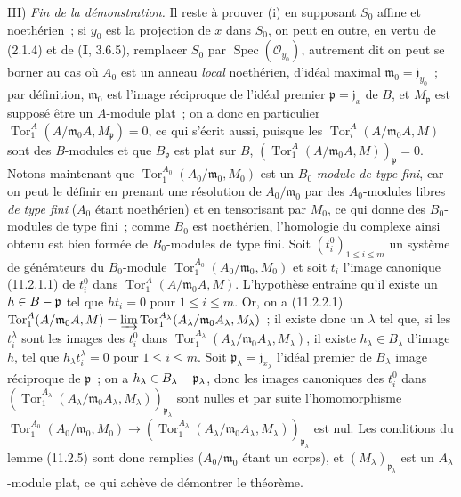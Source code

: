 \medskip
\noindent III) \emph{Fin de la démonstration.} Il reste à prouver
(i) en supposant $S_0$ affine et noethérien~; si $y_0$ est la projection de
$x$ dans $S_0$, on peut en outre, en vertu de (2.1.4) et de
($\mathbf I$, 3.6.5), remplacer $S_0$ par
$\operatorname{Spec}(\mathcal O_{y_0})$, autrement dit on peut se borner au
cas où $A_0$ est un anneau \emph{local} noethérien, d'idéal maximal
$\mathfrak m_0=\mathfrak j_{y_0}$~; par définition, $\mathfrak m_0$ est
l'image réciproque de l'idéal premier $\mathfrak p=\mathfrak j_x$ de $B$,
et $M_{\mathfrak p}$ est supposé être un $A$-module plat~; on a donc en
particulier $\operatorname{Tor}_1^A(A/\mathfrak m_0A,M_{\mathfrak p})=0$,
ce qui s'écrit aussi, puisque les $\operatorname{Tor}_i^A(A/\mathfrak m_0A,M)$
sont des $B$-modules et que $B_{\mathfrak p}$ est plat sur $B$,
$(\operatorname{Tor}_1^A(A/\mathfrak m_0A,M))_{\mathfrak p}=0$.
Notons maintenant que $\operatorname{Tor}_1^{A_0}(A_0/\mathfrak m_0,M_0)$
est un $B_0$-\emph{module de type fini}, car on peut le définir en prenant
une résolution de $A_0/\mathfrak m_0$ par des $A_0$-modules libres
\emph{de type fini} ($A_0$ étant noethérien) et en tensorisant par $M_0$, ce
qui donne des $B_0$-modules de type fini~; comme $B_0$ est noethérien,
l'homologie du complexe ainsi obtenu est bien formée de $B_0$-modules de
type fini. Soit $(t_i^0)_{1\leq i\leq m}$ un système de générateurs du
$B_0$-module $\operatorname{Tor}_1^{A_0}(A_0/\mathfrak m_0,M_0)$ et soit
$t_i$ l'image canonique (11.2.1.1) de $t_i^0$ dans
$\operatorname{Tor}_1^A(A/\mathfrak m_0A,M)$. L'hypothèse entraîne qu'il
existe un $h\in B-\mathfrak p$ tel que $ht_i=0$ pour $1\leq i\leq m$. Or,
on a (11.2.2.1)
$\operatorname{Tor}_1^A(A/\mathfrak m_0A,M)=
\varinjlim\operatorname{Tor}_1^{A_\lambda}
(A_\lambda/\mathfrak m_0A_\lambda,M_\lambda)$~;
il existe donc un $\lambda$ tel que, si les $t_i^\lambda$ sont les images
des $t_i^0$ dans
$\operatorname{Tor}_1^{A_\lambda}(A_\lambda/\mathfrak m_0A_\lambda,
M_\lambda)$, il existe $h_\lambda\in B_\lambda$ d'image $h$, tel que
$h_\lambda t_i^\lambda=0$ pour $1\leq i\leq m$. Soit
$\mathfrak p_\lambda=\mathfrak j_{x_\lambda}$ l'idéal premier de
$B_\lambda$ image réciproque de $\mathfrak p$~; on a
$h_\lambda\in B_\lambda-\mathfrak p_\lambda$, donc les images canoniques
des $t_i^0$ dans
$(\operatorname{Tor}_1^{A_\lambda}(A_\lambda/\mathfrak m_0A_\lambda,
M_\lambda))_{\mathfrak p_\lambda}$ sont nulles et par suite
l'homomorphisme
$\operatorname{Tor}_1^{A_0}(A_0/\mathfrak m_0,M_0)\to
(\operatorname{Tor}_1^{A_\lambda}(A_\lambda/\mathfrak m_0A_\lambda,
M_\lambda))_{\mathfrak p_\lambda}$ est nul. Les conditions du lemme
(11.2.5) sont donc remplies ($A_0/\mathfrak m_0$ étant un corps), et
$(M_\lambda)_{\mathfrak p_\lambda}$ est un $A_\lambda$-module plat, ce qui
achève de démontrer le théorème.

